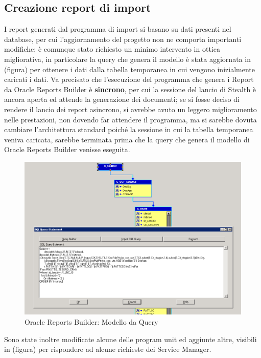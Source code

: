 \subsection{Creazione report di import}
I report generati dal programma di import si basano su dati presenti nel database, per cui l'aggiornamento del progetto non ne comporta importanti modifiche; è comunque stato richiesto un minimo intervento in ottica migliorativa, in particolare la query che genera il modello è stata aggiornata in (figura) per ottenere i dati dalla tabella temporanea in cui vengono inizialmente caricati i dati. Va precisato che l'esecuzione del programma che genera i Report da Oracle Reports Builder è \textbf{sincrono}, per cui la sessione del lancio di Stealth è ancora aperta ed attende la generazione dei documenti; se si fosse deciso di rendere il lancio dei report asincrono, si avrebbe avuto un leggero miglioramento nelle prestazioni, non dovendo far attendere il programma, ma si sarebbe dovuta cambiare l'architettura standard poiché la sessione in cui la tabella temporanea veniva caricata, sarebbe terminata prima che la query che genera il modello di Oracle Reports Builder venisse eseguita.\\
\begin{figure}[!h]
\thispagestyle{empty}
\centering
\includegraphics[scale=0.60]{img/QueryRep.png}
\caption{Oracle Reports Builder: Modello da Query}
\end{figure}
\newpage
Sono state inoltre modificate alcune delle program unit ed aggiunte altre, visibili in (figura) per rispondere ad alcune richieste dei Service Manager.\\

